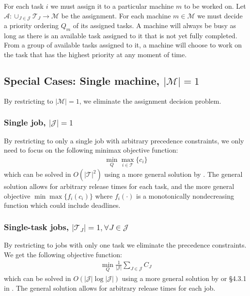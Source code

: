 For each task $i$ we must assign it to a particular machine $m$ to be worked on.
Let $\mathcal{A}:\cup_{J\in\mathcal{J}}\mathcal{T}_J\rightarrow \mathcal{M}$ be the assignment.
For each machine $m\in\mathcal{M}$ we must decide a priority ordering $Q_m$ of its assigned tasks.
A machine will always be busy as long as there is an available task assigned to it that is not yet fully completed.
From a group of available tasks assigned to it, a machine will choose to work on the task that has the highest priority at any moment of time.

\subsection{Special Cases: Single machine, $|\mathcal{M}|=1$}

By restricting to $|\mathcal{M}|=1$, we eliminate the assignment decision problem.

\subsubsection{Single job, $|\mathcal{J}|=1$}

By restricting to only a single job with arbitrary precedence constraints, we only need to focus on the following minimax objective function:
\begin{align}
	\min_Q \max_{i\in\mathcal{T}}\{c_i\}
\end{align}
which can be solved in $O(|\mathcal{T}|^2)$ using a more general solution by \cite{baker1983preemptive}.
The general solution allows for arbitrary release times for each task, and the more general objective $\min \max\{f_i(c_i)\}$ where $f_i(\cdot)$ is a monotonically nondecreasing function which could include deadlines.

\subsubsection{Single-task jobs, $|\mathcal{T}_J|=1,\forall J\in\mathcal{J}$}

By restricting to jobs with only one task we eliminate the precedence constraints.
We get the following objective function:
\begin{align}
	\min_Q \frac{1}{|\mathcal{J}|}\sum_{J\in\mathcal{J}} C_J
\end{align}
which can be solved in $O(|\mathcal{J}|\log |\mathcal{J}|)$ using a more general solution by \cite{baker1974introduction} or \S 4.3.1 in \cite{brucker2007scheduling}.
The general solution allows for arbitrary release times for each job.

